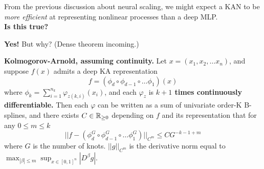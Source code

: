 \begin{frame}
    From the previous discussion about neural scaling, we might expect a KAN to
    be \textit{more efficient} at representing nonlinear processes than a deep MLP.
    \\ \vspace{5mm}
    \textbf{Is this true?}
\end{frame}

\begin{frame}
    \textbf{Yes!} 
    But why? (Dense theorem incoming.)
\end{frame}

\begin{frame}
    \begin{theorem}
        \textbf{Kolmogorov-Arnold, assuming continuity.} Let $x = (x_1, x_2, \ldots x_n)$, and suppose $f(x)$ admits
        a deep KA representation
        \[
        f = (\phi_{d} \circ \phi_{d - 1} \circ \ldots \phi_1)(x)
        \]
        where $\phi_k = \sum_{i = 1}^{n_k} \varphi_{z(k, i)}(x_i)$, and each $\varphi_z$ is \textbf{$k+1$ times continuously differentiable.}
        Then each $\varphi$ can be written as a sum of univariate order-K
        B-splines, and there exists $C \in \mathbb{R}_{\geq0}$ depending on $f$ and its
        representation that for any $0 \leq m \leq k$
        \[
            ||f - (\phi_{d}^G \circ \phi_{d-1}^G \circ \ldots \phi_1^G)||_{C^m} \leq CG^{-k-1+m}
        \]
        where $G$ is the number of knots. $|| g ||_{C^m}$ is the derivative norm equal to $\max_{|\beta| \leq m} \sup_{x \in [0, 1]^n} |D^\beta g |$.
    \end{theorem}
\end{frame}

